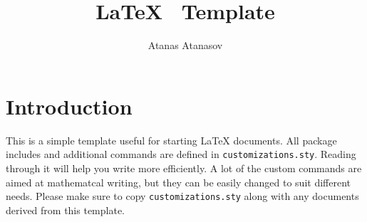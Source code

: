 \documentclass{article}
\begin{document}
\title{\LaTeX~ Template}
\author{Atanas Atanasov}
\date{}

\maketitle

\section{Introduction}
\label{S:introduction}

This is a simple template useful for starting LaTeX documents. All package includes and additional commands are defined in \texttt{customizations.sty}. Reading through it will help you write more efficiently. A lot of the custom commands are aimed at mathematcal writing, but they can be easily changed to suit different needs. Please make sure to copy \texttt{customizations.sty} along with any documents derived from this template.

\nocite{*}



\end{document}
